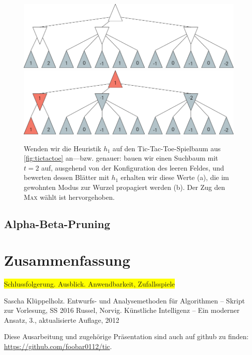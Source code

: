 \documentclass[a4paper,twoside]{scrartcl}
\newcommand\todo[1]{\colorbox{yellow}{#1}}
\begin{document}
\begin{figure}[!ht]
  \label{fig:heuristic}
  \centering
  \includegraphics[width=.8\textwidth]{minmax_heuristik.pdf}
  \\ \vspace{\baselineskip}
  \includegraphics[width=.8\textwidth]{minmax_heuristik_2.pdf}
  \caption{Wenden wir die Heuristik $h_1$ auf den Tic-Tac-Toe-Spielbaum aus \ref{fig:tictactoe} an---bzw. genauer: bauen wir einen Suchbaum mit $t = 2$ auf, ausgehend von der Konfiguration des leeren Feldes, und bewerten dessen Blätter mit $h_1$ erhalten wir diese Werte (a), die im gewohnten Modus zur Wurzel propagiert werden (b). Der Zug den \textsc{Max} wählt ist hervorgehoben.}
\end{figure}


\subsection{Alpha-Beta-Pruning}



\section{Zusammenfassung}

\todo{Schlussfolgerung. Ausblick. Anwendbarkeit, Zufallsspiele}


\begin{thebibliography}{99}
   Sascha Klüppelholz.
  \newblock Entwurfs- und Analysemethoden für Algorithmen -- Skript zur Vorlesung, SS 2016
   Russel, Norvig.
  \newblock Künstliche Intelligenz -- Ein moderner Ansatz, 3., aktualisierte Auflage, 2012 
\end{thebibliography}


\vspace{4\baselineskip}
Diese Ausarbeitung und zugehörige Präsentation sind auch auf github zu finden: \\\url{https://github.com/foobar0112/tic}.
\end{document}
